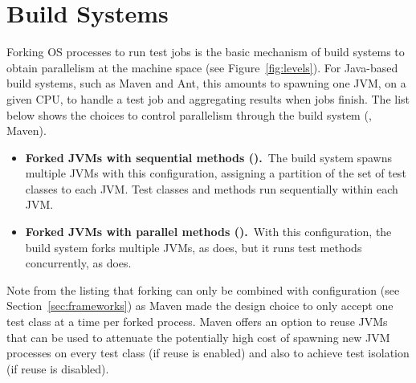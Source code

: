 \section{Build Systems}
\label{sec:builder}

Forking OS processes to run test jobs is the basic mechanism of build
systems to obtain parallelism at the machine space (see
Figure~\ref{fig:levels}).  For Java-based build systems, such as Maven
and Ant, this amounts to spawning one JVM, on a given CPU, to handle a
test job and aggregating results when jobs finish.  The list below
shows the choices to control parallelism through the build system
(\eg{}, Maven).

\begin{itemize}
\item
  \textbf{Forked JVMs with sequential methods (\ForkSeq).}~The build
  system spawns multiple JVMs with this configuration, assigning a
  partition of the set of test classes to each JVM.  Test classes and methods
  run sequentially within each JVM.
\item
  \textbf{Forked JVMs with parallel methods (\ForkParMeth).}~With
  this configuration, the build system forks multiple JVMs, as
  \ForkSeq{} does, but it runs test methods concurrently, as
  \SeqClassParMeth{} does.
\end{itemize}


Note from the listing that forking can only be combined with
configuration \SeqClassParMeth{} (see Section~\ref{sec:frameworks}) as
Maven made the design choice to only accept one test class at a time
per forked process.  Maven offers an option to reuse JVMs that can be
used to attenuate the potentially high cost of spawning new JVM
processes on every test class (if reuse is enabled) and also to
achieve test isolation (if reuse is disabled).


